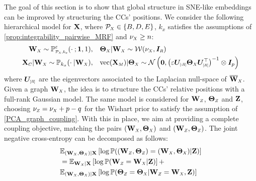 The goal of this section is to show that global structure in SNE-like embeddings can be improved by structuring the CCs' positions. We consider the following hierarchical model for $\mathbf{X}$, where $\mathcal{P}_{\scaleto{X}{4pt}} \in \{B,D,E\}$, $k_x$ satisfies the assumptions of \cref{prop:integrability_pairwise_MRF} and $\nu_{\scaleto{X}{4pt}} \geq n$:
\begin{align*}
    \W_{\scaleto{X}{4pt}} \sim \mathbb{P}_{\scaleto{\mathcal{P}_{\scaleto{X}{3pt}},k_x}{5pt}}^{\varepsilon}(\cdot \: ; \bm{1},1), &\quad \bm{\Theta}_{\scaleto{X}{4pt}} | \W_{\scaleto{X}{4pt}} \sim \mathcal{W}(\nu_{\scaleto{X}{4pt}}, \bm{I}_{\scaleto{R}{4pt}}) \\
    \X_{\scaleto{C}{4pt}} |\W_{\scaleto{X}{4pt}} \sim \mathbb{P}_{k_x}(\cdot \:| \W_{\scaleto{X}{4pt}}), &\quad \mathrm{vec}(\X_{\scaleto{M}{4pt}}) | \bm{\Theta}_{\scaleto{X}{4pt}} \sim \mathcal{N}\left(\bm{0}, \left(\varepsilon \bm{U}_{\scaleto{[:R]}{5pt}}  \bm{\Theta}_{\scaleto{X}{4pt}}\bm{U}^\top_{\scaleto{[R]}{5pt}}\right)^{-1} \otimes \bm{I}_p\right)
\end{align*}
where $\bm{U}_{\scaleto{[R]}{5pt}}$ are the eigenvectors associated to the Laplacian null-space of $\overline{\W}_{\scaleto{X}{4pt}}$. Given a graph $\W_{\scaleto{X}{4pt}}$, the idea is to structure the CCs' relative positions with a full-rank Gaussian model.
The same model is considered for $\W_{\scaleto{Z}{4pt}}$, $\bm{\Theta}_{\scaleto{Z}{4pt}}$ and $\mathbf{Z}$, choosing $\nu_{\scaleto{Z}{4pt}} = \nu_{\scaleto{X}{4pt}} + p - q$ for the Wishart prior to satisfy the assumption of \cref{PCA_graph_coupling}.  With this in place, we aim at providing a complete coupling objective, matching the pairs  $(\W_{\scaleto{X}{4pt}},\bm{\Theta}_{\scaleto{X}{4pt}})$ and  $(\W_{\scaleto{Z}{4pt}},\bm{\Theta}_{\scaleto{Z}{4pt}})$. The joint negative cross-entropy can be decomposed as follows:
\begin{align}
    &\mathbb{E}_{(\W_{\scaleto{X}{3pt}}, \bm{\Theta}_{\scaleto{X}{3pt}})|\X}\left[\log \mathbb{P}((\W_{\scaleto{Z}{4pt}},\bm{\Theta}_{\scaleto{Z}{4pt}}) = (\W_{\scaleto{X}{4pt}},\bm{\Theta}_{\scaleto{X}{4pt}}) | \Z)\right] \nonumber\\
    &= \mathbb{E}_{\W_{\scaleto{X}{3pt}}|\X}\left[\log \mathbb{P}(\W_{\scaleto{Z}{4pt}} = \W_{\scaleto{X}{4pt}} | \Z)\right] + \label{eq:loss_LW} \\
    & \mathbb{E}_{(\W_{\scaleto{X}{3pt}},\bm{\Theta}_{\scaleto{X}{3pt}})|\X}\left[ \log \mathbb{P}(\bm{\Theta}_{\scaleto{Z}{4pt}} = \bm{\Theta}_{\scaleto{X}{4pt}}| \W_{\scaleto{Z}{4pt}} = \W_{\scaleto{X}{4pt}}, \Z) \right] \label{eq:add_term_Coupling}
\end{align}
